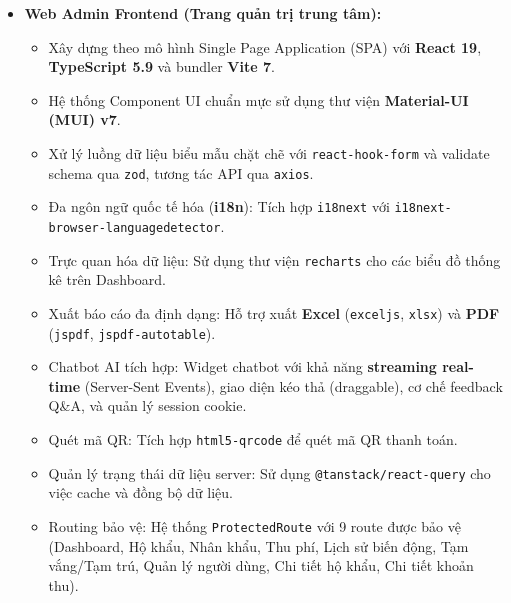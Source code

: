 \documentclass[12pt,a4paper]{article}
\begin{document}
\begin{itemize}[leftmargin=*]
    \item \textbf{Web Admin Frontend (Trang quản trị trung tâm):} 
    \begin{itemize}
        \item Xây dựng theo mô hình Single Page Application (SPA) với \textbf{React 19}, \textbf{TypeScript 5.9} và bundler \textbf{Vite 7}.
        \item Hệ thống Component UI chuẩn mực sử dụng thư viện \textbf{Material-UI (MUI) v7}.
        \item Xử lý luồng dữ liệu biểu mẫu chặt chẽ với \texttt{react-hook-form} và validate schema qua \texttt{zod}, tương tác API qua \texttt{axios}.
        \item Đa ngôn ngữ quốc tế hóa (\textbf{i18n}): Tích hợp \texttt{i18next} với \texttt{i18next-browser-languagedetector}.
        \item Trực quan hóa dữ liệu: Sử dụng thư viện \texttt{recharts} cho các biểu đồ thống kê trên Dashboard.
        \item Xuất báo cáo đa định dạng: Hỗ trợ xuất \textbf{Excel} (\texttt{exceljs}, \texttt{xlsx}) và \textbf{PDF} (\texttt{jspdf}, \texttt{jspdf-autotable}).
        \item Chatbot AI tích hợp: Widget chatbot với khả năng \textbf{streaming real-time} (Server-Sent Events), giao diện kéo thả (draggable), cơ chế feedback Q\&A, và quản lý session cookie.
        \item Quét mã QR: Tích hợp \texttt{html5-qrcode} để quét mã QR thanh toán.
        \item Quản lý trạng thái dữ liệu server: Sử dụng \texttt{@tanstack/react-query} cho việc cache và đồng bộ dữ liệu.
        \item Routing bảo vệ: Hệ thống \texttt{ProtectedRoute} với 9 route được bảo vệ (Dashboard, Hộ khẩu, Nhân khẩu, Thu phí, Lịch sử biến động, Tạm vắng/Tạm trú, Quản lý người dùng, Chi tiết hộ khẩu, Chi tiết khoản thu).
    \end{itemize}


\end{itemize}
\end{document}
